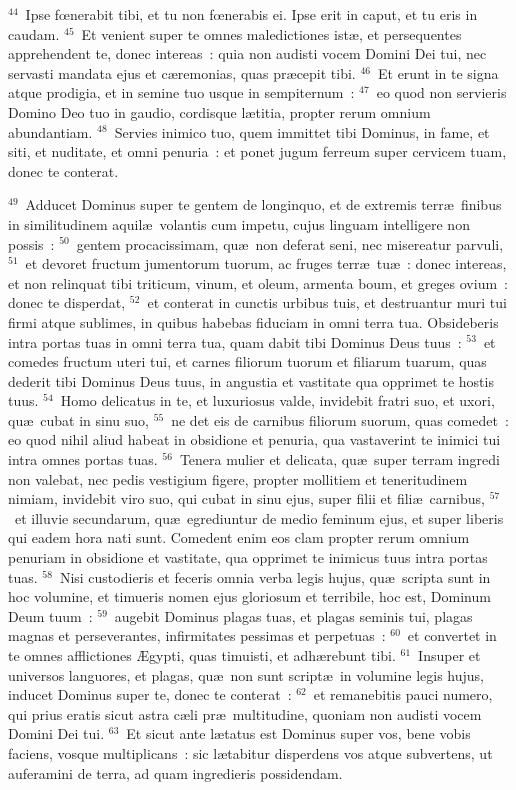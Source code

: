 ${}^{44}$~Ipse fœnerabit tibi, et tu non fœnerabis ei. Ipse erit in caput, et tu eris in caudam.
${}^{45}$~Et venient super te omnes maledictiones ist\ae , et persequentes apprehendent te, donec intereas~: quia non audisti vocem Domini Dei tui, nec servasti mandata ejus et c\ae remonias, quas pr\ae cepit tibi.
${}^{46}$~Et erunt in te signa atque prodigia, et in semine tuo usque in sempiternum~:
${}^{47}$~eo quod non servieris Domino Deo tuo in gaudio, cordisque l\ae titia, propter rerum omnium abundantiam.
${}^{48}$~Servies inimico tuo, quem immittet tibi Dominus, in fame, et siti, et nuditate, et omni penuria~: et ponet jugum ferreum super cervicem tuam, donec te conterat.


${}^{49}$~Adducet Dominus super te gentem de longinquo, et de extremis terr\ae\ finibus in similitudinem aquil\ae\ volantis cum impetu, cujus linguam intelligere non possis~:
${}^{50}$~gentem procacissimam, qu\ae\ non deferat seni, nec misereatur parvuli,
${}^{51}$~et devoret fructum jumentorum tuorum, ac fruges terr\ae\ tu\ae~: donec intereas, et non relinquat tibi triticum, vinum, et oleum, armenta boum, et greges ovium~: donec te disperdat,
${}^{52}$~et conterat in cunctis urbibus tuis, et destruantur muri tui firmi atque sublimes, in quibus habebas fiduciam in omni terra tua. Obsideberis intra portas tuas in omni terra tua, quam dabit tibi Dominus Deus tuus~:
${}^{53}$~et comedes fructum uteri tui, et carnes filiorum tuorum et filiarum tuarum, quas dederit tibi Dominus Deus tuus, in angustia et vastitate qua opprimet te hostis tuus.
${}^{54}$~Homo delicatus in te, et luxuriosus valde, invidebit fratri suo, et uxori, qu\ae\ cubat in sinu suo,
${}^{55}$~ne det eis de carnibus filiorum suorum, quas comedet~: eo quod nihil aliud habeat in obsidione et penuria, qua vastaverint te inimici tui intra omnes portas tuas.
${}^{56}$~Tenera mulier et delicata, qu\ae\ super terram ingredi non valebat, nec pedis vestigium figere, propter mollitiem et teneritudinem nimiam, invidebit viro suo, qui cubat in sinu ejus, super filii et fili\ae\ carnibus,
${}^{57}$~et illuvie secundarum, qu\ae\ egrediuntur de medio feminum ejus, et super liberis qui eadem hora nati sunt. Comedent enim eos clam propter rerum omnium penuriam in obsidione et vastitate, qua opprimet te inimicus tuus intra portas tuas.
${}^{58}$~Nisi custodieris et feceris omnia verba legis hujus, qu\ae\ scripta sunt in hoc volumine, et timueris nomen ejus gloriosum et terribile, hoc est, Dominum Deum tuum~:
${}^{59}$~augebit Dominus plagas tuas, et plagas seminis tui, plagas magnas et perseverantes, infirmitates pessimas et perpetuas~:
${}^{60}$~et convertet in te omnes afflictiones \AE gypti, quas timuisti, et adh\ae rebunt tibi.
${}^{61}$~Insuper et universos languores, et plagas, qu\ae\ non sunt script\ae\ in volumine legis hujus, inducet Dominus super te, donec te conterat~:
${}^{62}$~et remanebitis pauci numero, qui prius eratis sicut astra c\ae li pr\ae\ multitudine, quoniam non audisti vocem Domini Dei tui.
${}^{63}$~Et sicut ante l\ae tatus est Dominus super vos, bene vobis faciens, vosque multiplicans~: sic l\ae tabitur disperdens vos atque subvertens, ut auferamini de terra, ad quam ingredieris possidendam.


